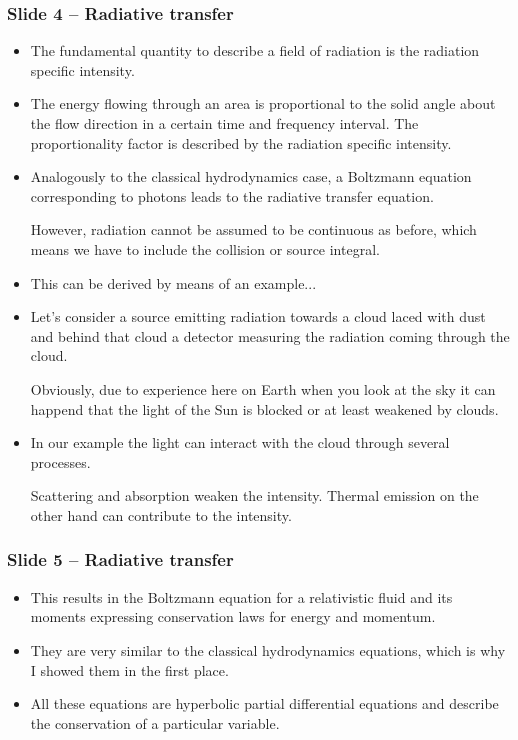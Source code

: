 \documentclass{beamer}
\begin{document}
\begin{frame}
 \frametitle{Slide 4 -- Radiative transfer}
 \begin{itemize}
  \item The fundamental quantity to describe a field of radiation is the radiation specific intensity.

  \item The energy flowing through an area is proportional to the solid angle about the flow direction in a certain time and frequency interval.
  The proportionality factor is described by the radiation specific intensity.

  \item Analogously to the classical hydrodynamics case, a Boltzmann equation corresponding to photons leads to the radiative transfer equation.

  However, radiation cannot be assumed to be continuous as before, which means we have to include the collision or source integral.

  \item This can be derived by means of an example...
 \end{itemize}
\end{frame}
\begin{frame}
 \begin{itemize}
  \item Let's consider a source emitting radiation towards a cloud laced with dust and behind that cloud a detector measuring the radiation coming through the cloud.

  Obviously, due to experience here on Earth when you look at the sky it can happend that the light of the Sun is blocked or at least weakened by clouds.
  \item In our example the light can interact with the cloud through several processes.

  Scattering and absorption weaken the intensity.
  Thermal emission on the other hand can contribute to the intensity.
 \end{itemize}
\end{frame}
\begin{frame}
 \frametitle{Slide 5 -- Radiative transfer}
 \begin{itemize}
  \item This results in the Boltzmann equation for a relativistic fluid and its moments expressing conservation laws for energy and momentum.

  \item They are very similar to the classical hydrodynamics equations, which is why I showed them in the first place.

  \item All these equations are hyperbolic partial differential equations and describe the conservation of a particular variable.
 \end{itemize}
\end{frame}
\end{document}
